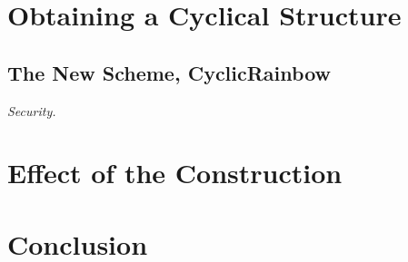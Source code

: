 \documentclass[a4paper, 14pt]{extarticle}
\begin{document}
\section{Obtaining a Cyclical Structure}\label{sec:cyclic}

\subsection{The New Scheme, CyclicRainbow}

\emph{Security.}

\section{Effect of the Construction}\label{sec:effect}

\section{Conclusion}\label{sec:conclusion}


{\footnotesize
}
\end{document}

